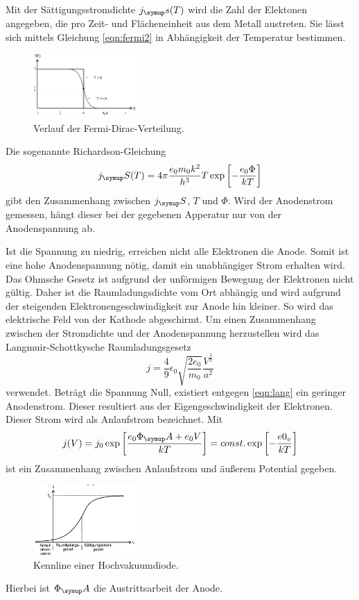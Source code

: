 Mit der Sättigungsstromdichte $j_\su{s(T)}$ wird die Zahl der Elektonen angegeben,
die pro Zeit- und Flächeneinheit aus dem Metall austreten. Sie lässt sich mittels
Gleichung \eqref{eqn:fermi2} in Abhängigkeit der Temperatur bestimmen.

\begin{figure}
  \includegraphics[width = 4cm]{bilder/dirac.jpg}
  \caption{Verlauf der Fermi-Dirac-Verteilung.\cite{504}}
  \label{dirac}
\end{figure}
Die sogenannte Richardson-Gleichung
\begin{equation*}
  j_\su{S}(T) = 4\pi\frac{e_0 m_0 k^2}{h^3}T\exp\left[-\frac{e_0\Phi}{kT}\right]
  \label{eqn:richard}
\end{equation*}
gibt den Zusammenhang zwischen $j_\su{S}$, $T$ und $\Phi$. Wird der Anodenstrom
gemessen, hängt dieser bei der gegebenen Apperatur nur von der Anodenspannung ab.

Ist die Spannung zu niedrig, erreichen nicht alle Elektronen die Anode. Somit ist
eine hohe Anodenspannung nötig, damit ein unabhängiger Strom erhalten wird.
Das Ohmsche Gesetz ist aufgrund der unförmigen Bewegung der Elektronen nicht
gültig. Daher ist die Raumladungsdichte vom Ort abhängig und wird aufgrund der
steigenden Elektronengeschwindigkeit zur Anode hin kleiner. So wird das elektrische
Feld von der Kathode abgeschirmt.
Um einen Zusammenhang zwischen der Stromdichte und der Anodenspannung herzustellen
wird das Langmuir-Schottkysche Raumladungsgesetz
\begin{equation}
  j = \frac{4}{9}\epsilon_0\sqrt{\frac{2e_0}{m_0}}\frac{V^{\frac{3}{2}}}{a^2}
  \label{eqn:lang}
\end{equation}
verwendet.
Beträgt die Spannung Null, existiert entgegen \eqref{eqn:lang} ein geringer
Anodenstrom. Dieser resultiert aus der Eigengeschwindigkeit der Elektronen. Dieser
Strom wird als Anlaufstrom bezeichnet.
Mit
\begin{equation}
  j(V) = j_0\exp\left[\frac{e_0\Phi_\su{A}+e_0 V}{kT}\right] = const. \exp\left[-\frac
  {e0_v}{kT}\right]
\end{equation}
ist ein Zusammenhang zwischen Anlaufstrom und äußerem Potential gegeben.

\begin{figure}
  \includegraphics[width=4cm]{bilder/kennlinie.jpg}
  \caption{Kennline einer Hochvakuumdiode.\cite{504}}
  \label{kenn}
\end{figure}
Hierbei ist $\Phi_\su{A}$ die Austrittsarbeit der Anode.

